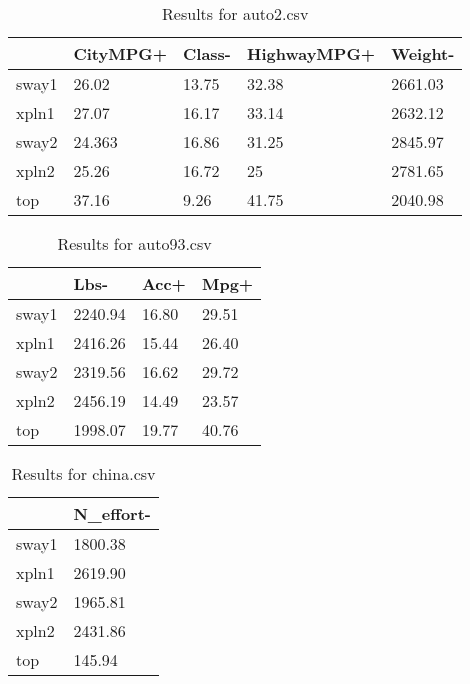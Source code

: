\begin{table}[]
  \begin{center}
  \begin{tabular}{lllll}
          & CityMPG+      & Class-     & HighwayMPG+ & Weight-   \\
    \hline
    sway1 & 26.02         & 13.75      & 32.38       & 2661.03 \\
    xpln1 & 27.07         & 16.17      & 33.14       & 2632.12   \\
    sway2 & 24.363        & 16.86      & 31.25       & 2845.97   \\
    xpln2 & 25.26         & 16.72      & 25          & 2781.65   \\
    top   & 37.16         & 9.26       & 41.75       & 2040.98    
  \end{tabular}
  \end{center}
  \caption{Results for auto2.csv}
  \label{tab:auto2}
\end{table}


\begin{table}[]
  \begin{center}
  \begin{tabular}{llll}
        & Lbs-    & Acc+  & Mpg+  \\
  \hline
  sway1 & 2240.94 & 16.80 & 29.51 \\
  xpln1 & 2416.26 & 15.44 & 26.40 \\
  sway2 & 2319.56 & 16.62 & 29.72 \\
  xpln2 & 2456.19 & 14.49 & 23.57 \\
  top   & 1998.07 & 19.77 & 40.76
  \end{tabular}
\end{center}
  \caption{Results for auto93.csv}
  \label{tab:auto93}
\end{table}


\begin{table}[]
  \begin{center}
  \begin{tabular}{ll}
        & N\_effort- \\
  \hline
  sway1 & 1800.38    \\
  xpln1 & 2619.90    \\
  sway2 & 1965.81    \\
  xpln2 & 2431.86    \\
  top   & 145.94    
  \end{tabular}
  \end{center}
  \caption{Results for china.csv}
  \label{tab:china}
\end{table}


